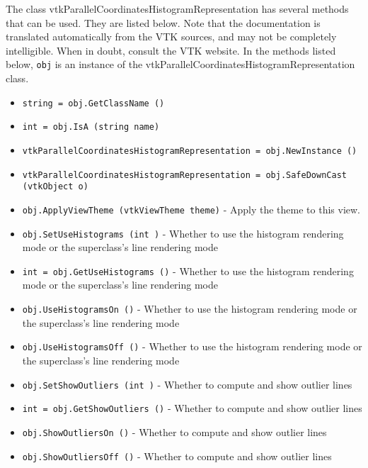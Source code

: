 The class vtkParallelCoordinatesHistogramRepresentation has several methods that can be used.
  They are listed below.
Note that the documentation is translated automatically from the VTK sources,
and may not be completely intelligible.  When in doubt, consult the VTK website.
In the methods listed below, \verb|obj| is an instance of the vtkParallelCoordinatesHistogramRepresentation class.
\begin{itemize}
\item  \verb|string = obj.GetClassName ()|

\item  \verb|int = obj.IsA (string name)|

\item  \verb|vtkParallelCoordinatesHistogramRepresentation = obj.NewInstance ()|

\item  \verb|vtkParallelCoordinatesHistogramRepresentation = obj.SafeDownCast (vtkObject o)|

\item  \verb|obj.ApplyViewTheme (vtkViewTheme theme)| -  Apply the theme to this view.

\item  \verb|obj.SetUseHistograms (int )| -  Whether to use the histogram rendering mode or the superclass's line rendering mode

\item  \verb|int = obj.GetUseHistograms ()| -  Whether to use the histogram rendering mode or the superclass's line rendering mode

\item  \verb|obj.UseHistogramsOn ()| -  Whether to use the histogram rendering mode or the superclass's line rendering mode

\item  \verb|obj.UseHistogramsOff ()| -  Whether to use the histogram rendering mode or the superclass's line rendering mode

\item  \verb|obj.SetShowOutliers (int )| -  Whether to compute and show outlier lines

\item  \verb|int = obj.GetShowOutliers ()| -  Whether to compute and show outlier lines

\item  \verb|obj.ShowOutliersOn ()| -  Whether to compute and show outlier lines

\item  \verb|obj.ShowOutliersOff ()| -  Whether to compute and show outlier lines


\end{itemize}
